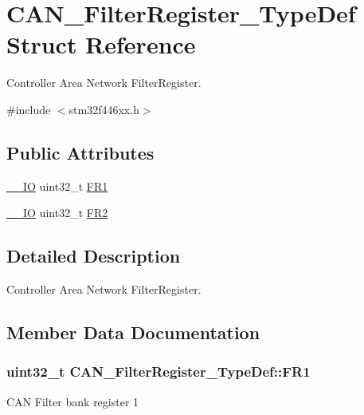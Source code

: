 \hypertarget{struct_c_a_n___filter_register___type_def}{}\section{C\+A\+N\+\_\+\+Filter\+Register\+\_\+\+Type\+Def Struct Reference}
\label{struct_c_a_n___filter_register___type_def}


Controller Area Network Filter\+Register.  




{\ttfamily \#include $<$stm32f446xx.\+h$>$}

\subsection*{Public Attributes}
\begin{DoxyCompactItemize}
\item 
\hyperlink{core__sc300_8h_aec43007d9998a0a0e01faede4133d6be}{\+\_\+\+\_\+\+IO} uint32\+\_\+t \hyperlink{struct_c_a_n___filter_register___type_def_ac9bc1e42212239d6830582bf0c696fc5}{F\+R1}
\item 
\hyperlink{core__sc300_8h_aec43007d9998a0a0e01faede4133d6be}{\+\_\+\+\_\+\+IO} uint32\+\_\+t \hyperlink{struct_c_a_n___filter_register___type_def_a77959e28a302b05829f6a1463be7f800}{F\+R2}
\end{DoxyCompactItemize}


\subsection{Detailed Description}
Controller Area Network Filter\+Register. 

\subsection{Member Data Documentation}
\subsubsection[{\texorpdfstring{F\+R1}{FR1}}]{ uint32\+\_\+t C\+A\+N\+\_\+\+Filter\+Register\+\_\+\+Type\+Def\+::\+F\+R1}\hypertarget{struct_c_a_n___filter_register___type_def_ac9bc1e42212239d6830582bf0c696fc5}{}\label{struct_c_a_n___filter_register___type_def_ac9bc1e42212239d6830582bf0c696fc5}
C\+AN Filter bank register 1 

